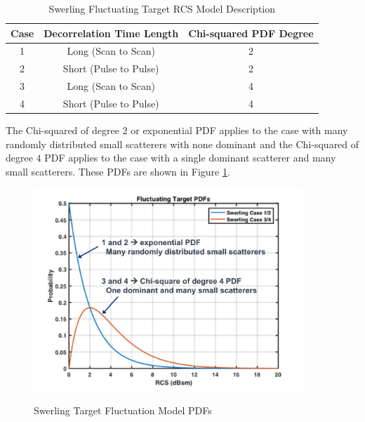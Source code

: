 \begin{table}[H]
  \begin{center}
      \renewcommand{\baselinestretch}{1} \small\normalsize
  \begin{quote}
    \caption[Swerling Fluctuating Target RCS Model Description]{Swerling Fluctuating Target RCS Model Description\label{env_tab:1}}
  \end{quote}
  \begin{tabular} {|c | c | c |}
    \hline
  \bf{Case} & \bf{Decorrelation Time Length} & \bf{Chi-squared PDF Degree} \\ \hline
  1 &Long (Scan to Scan) &2 \\ \hline
  2 &Short (Pulse to Pulse) &2 \\ \hline
  3 &Long (Scan to Scan) &4 \\ \hline
  4 &Short (Pulse to Pulse) &4 \\ \hline
\end{tabular}
\end{center}
\end{table}
\renewcommand{\baselinestretch}{2} \small\normalsize
The Chi-squared of degree $2$ or exponential PDF applies to the case with many randomly distributed small scatterers with none dominant and the Chi-squared of degree $4$ PDF applies to the case with a single dominant scatterer and many small scatterers. These PDFs are shown in Figure \ref{env_fig:4}.
\begin{figure}[H]
  \begin{center}
\includegraphics[width=4in]{../media/multistatic/swerling_pdfs.png}
  \end{center}
  \renewcommand{\baselinestretch}{1} \small\normalsize
  \begin{quote}
    \caption[Swerling Target Fluctuation Model PDFs]{Swerling Target Fluctuation Model PDFs\label{env_fig:4}}
  \end{quote}
\end{figure}
\renewcommand{\baselinestretch}{2} \small\normalsize

